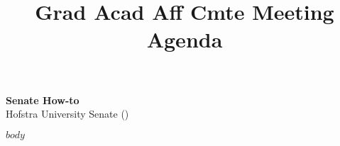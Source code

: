 \documentclass[12pt]{article}
\title{Grad Acad Aff Cmte Meeting Agenda \DTMusedate{meetingdate}}
\begin{document}
\thispagestyle{empty}


\begin{center}
  \textbf{\large Senate How-to} \\ Hofstra University Senate (\the\year) 
\end{center}


\begin{center}
\begin{minipage}[c]{4.25in} %
\tableofcontents
\end{minipage}
\end{center}



$body$
\end{document}
